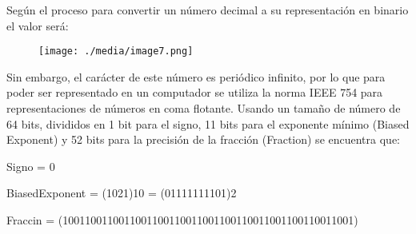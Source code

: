 \documentclass[12pt]{article}
\renewcommand{\_}{\kern-1.5pt\textunderscore\kern-1.5pt}
\begin{document}
\begin{enumerate}
\vspace{\baselineskip}
\setlength{\parskip}{8.04pt}
\setlength{\parskip}{0.0pt}
\begin{justify}
{\fontsize{10pt}{12.0pt}\selectfont Según el proceso para convertir un número decimal a su representación en binario el valor será: \par}
\end{justify}\par




\begin{figure}[H]
	\begin{Center}
		\texttt{[image: ./media/image7.png]}
	\end{Center}
\end{figure}



\par

\begin{justify}
{\fontsize{10pt}{12.0pt}\selectfont Sin embargo, el carácter de este número es periódico infinito, por lo que para poder ser representado en un computador se utiliza la norma IEEE 754 para representaciones de números en coma flotante. Usando un tamaño de número de 64 bits, divididos en 1 bit para el signo, 11 bits para el exponente mínimo (Biased Exponent) y 52 bits para la precisión de la fracción (Fraction) se encuentra que: \par}
\end{justify}\par

\begin{justify}
{\fontsize{10pt}{12.0pt}\selectfont Signo = 0 \par}
\end{justify}\par

\begin{justify}
{\fontsize{10pt}{12.0pt}\selectfont BiasedExponent = (1021)10 = (01111111101)2 \par}
\end{justify}\par

\begin{justify}
{\fontsize{10pt}{12.0pt}\selectfont Fraccin = (1001100110011001100110011001100110011001100110011001) \par}
\end{justify}\par



\end{enumerate}
\end{document}
